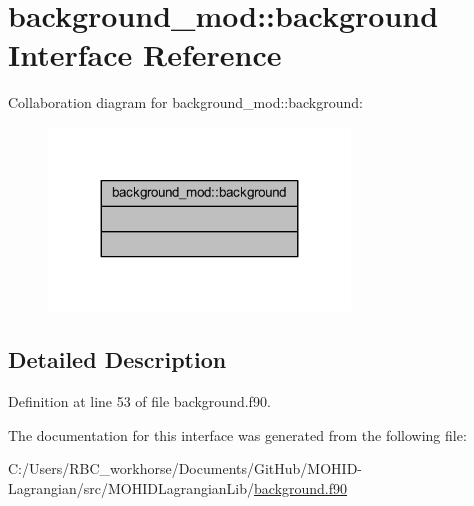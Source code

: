 \hypertarget{interfacebackground__mod_1_1background}{}\section{background\+\_\+mod\+:\+:background Interface Reference}
\label{interfacebackground__mod_1_1background}


Collaboration diagram for background\+\_\+mod\+:\+:background\+:\nopagebreak
\begin{figure}[H]
\begin{center}
\leavevmode
\includegraphics[width=227pt]{interfacebackground__mod_1_1background__coll__graph}
\end{center}
\end{figure}


\subsection{Detailed Description}


Definition at line 53 of file background.\+f90.



The documentation for this interface was generated from the following file\+:\begin{DoxyCompactItemize}
\item 
C\+:/\+Users/\+R\+B\+C\+\_\+workhorse/\+Documents/\+Git\+Hub/\+M\+O\+H\+I\+D-\/\+Lagrangian/src/\+M\+O\+H\+I\+D\+Lagrangian\+Lib/\mbox{\hyperlink{background_8f90}{background.\+f90}}\end{DoxyCompactItemize}
